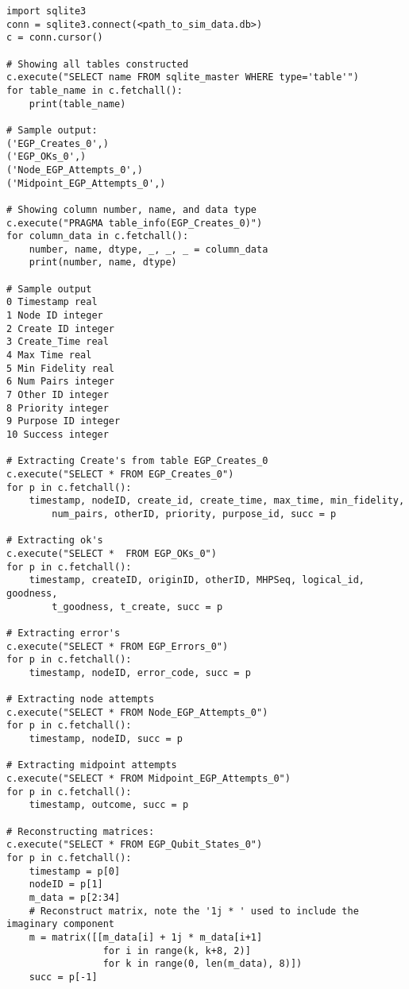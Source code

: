 \documentclass{article}
\begin{document}
\begin{verbatim}
import sqlite3
conn = sqlite3.connect(<path_to_sim_data.db>)
c = conn.cursor()

# Showing all tables constructed
c.execute("SELECT name FROM sqlite_master WHERE type='table'")
for table_name in c.fetchall():
    print(table_name)

# Sample output:
('EGP_Creates_0',)
('EGP_OKs_0',)
('Node_EGP_Attempts_0',)
('Midpoint_EGP_Attempts_0',)

# Showing column number, name, and data type
c.execute("PRAGMA table_info(EGP_Creates_0)")
for column_data in c.fetchall():
    number, name, dtype, _, _, _ = column_data
    print(number, name, dtype)

# Sample output
0 Timestamp real
1 Node ID integer
2 Create ID integer
3 Create_Time real
4 Max Time real
5 Min Fidelity real
6 Num Pairs integer
7 Other ID integer
8 Priority integer
9 Purpose ID integer
10 Success integer

# Extracting Create's from table EGP_Creates_0
c.execute("SELECT * FROM EGP_Creates_0")
for p in c.fetchall():
    timestamp, nodeID, create_id, create_time, max_time, min_fidelity,
        num_pairs, otherID, priority, purpose_id, succ = p

# Extracting ok's
c.execute("SELECT *  FROM EGP_OKs_0")
for p in c.fetchall():
    timestamp, createID, originID, otherID, MHPSeq, logical_id, goodness,
        t_goodness, t_create, succ = p

# Extracting error's
c.execute("SELECT * FROM EGP_Errors_0")
for p in c.fetchall():
    timestamp, nodeID, error_code, succ = p

# Extracting node attempts
c.execute("SELECT * FROM Node_EGP_Attempts_0")
for p in c.fetchall():
    timestamp, nodeID, succ = p

# Extracting midpoint attempts
c.execute("SELECT * FROM Midpoint_EGP_Attempts_0")
for p in c.fetchall():
    timestamp, outcome, succ = p

# Reconstructing matrices:
c.execute("SELECT * FROM EGP_Qubit_States_0")
for p in c.fetchall():
    timestamp = p[0]
    nodeID = p[1]
    m_data = p[2:34]
    # Reconstruct matrix, note the '1j * ' used to include the imaginary component
    m = matrix([[m_data[i] + 1j * m_data[i+1]
                 for i in range(k, k+8, 2)]
                 for k in range(0, len(m_data), 8)])
    succ = p[-1]

\end{verbatim}
\end{document}
